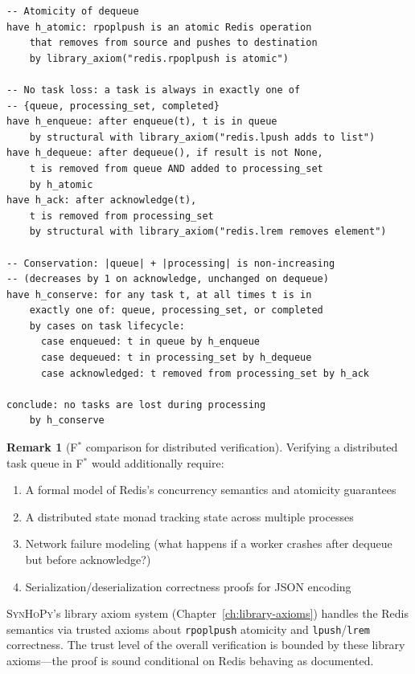 \documentclass[11pt,a4paper]{report}
\theoremstyle{definition}
\newtheorem{remark}[definition]{Remark}
\theoremstyle{plain}
\newcommand{\fstar}{F$^{*}$}
\newcommand{\synhopy}{\textsc{SynHoPy}}
\begin{document}
\begin{lstlisting}[style=proof]
-- Atomicity of dequeue
have h_atomic: rpoplpush is an atomic Redis operation
    that removes from source and pushes to destination
    by library_axiom("redis.rpoplpush is atomic")

-- No task loss: a task is always in exactly one of
-- {queue, processing_set, completed}
have h_enqueue: after enqueue(t), t is in queue
    by structural with library_axiom("redis.lpush adds to list")
have h_dequeue: after dequeue(), if result is not None,
    t is removed from queue AND added to processing_set
    by h_atomic
have h_ack: after acknowledge(t),
    t is removed from processing_set
    by structural with library_axiom("redis.lrem removes element")

-- Conservation: |queue| + |processing| is non-increasing
-- (decreases by 1 on acknowledge, unchanged on dequeue)
have h_conserve: for any task t, at all times t is in
    exactly one of: queue, processing_set, or completed
    by cases on task lifecycle:
      case enqueued: t in queue by h_enqueue
      case dequeued: t in processing_set by h_dequeue
      case acknowledged: t removed from processing_set by h_ack

conclude: no tasks are lost during processing
    by h_conserve
\end{lstlisting}

\begin{remark}[\fstar{} comparison for distributed verification]
Verifying a distributed task queue in \fstar{} would additionally require:
\begin{enumerate}
  \item A formal model of Redis's concurrency semantics and atomicity guarantees
  \item A distributed state monad tracking state across multiple processes
  \item Network failure modeling (what happens if a worker crashes after
    dequeue but before acknowledge?)
  \item Serialization/deserialization correctness proofs for JSON encoding
\end{enumerate}
\synhopy{}'s library axiom system (Chapter~\ref{ch:library-axioms}) handles
the Redis semantics via trusted axioms about \lstinline[style=python]{rpoplpush}
atomicity and \lstinline[style=python]{lpush}/\lstinline[style=python]{lrem}
correctness.  The trust level of the overall verification is bounded by
these library axioms---the proof is sound conditional on Redis behaving
as documented.
\end{remark}
\end{document}
